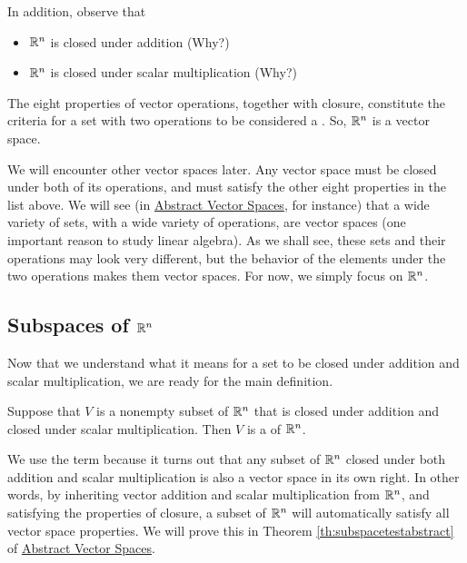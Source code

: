 \documentclass{ximera}
\begin{document}
  In addition, observe that  
  \begin{itemize}
      \item[]  $\mathbb{R}^n$ is closed under addition (Why?)
      \item[] $\mathbb{R}^n$ is closed under scalar multiplication (Why?)
\end{itemize}      
      The eight properties of vector operations, together with closure, constitute the criteria for a set with two operations to be considered a . So, $\mathbb{R}^n$ is a vector space.  
      
      We will encounter other vector spaces later. Any vector space must be closed under both of its operations, and must satisfy the other eight properties in the list above.  We will see (in \href{https://ximera.osu.edu/oerlinalg/LinearAlgebra/VSP-0050/main}{Abstract Vector Spaces}, for instance) that a wide variety of sets, with a wide variety of operations, are vector spaces (one important reason to study linear algebra).  As we shall see, these sets and their operations may look very different, but the behavior of the elements under the two operations makes them vector spaces.  For now, we simply focus on $\mathbb{R}^n$.


\subsection*{Subspaces of $\mathbb{R}^n$}

Now that we understand what it means for a set to be closed under addition and scalar multiplication, we are ready for the main definition.

\begin{definition}\label{def:subspace} Suppose that $V$ is a nonempty subset of $\mathbb{R}^n$ that is closed under addition and closed under scalar multiplication.  Then $V$ is a  of $\mathbb{R}^n$.
\end{definition}
We use the term  because it turns out that any subset of $\mathbb{R}^n$ closed under both addition and scalar multiplication is also a vector space in its own right.  In other words, by inheriting vector addition and scalar multiplication from $\mathbb{R}^n$, and satisfying the properties of closure, a subset of $\mathbb{R}^n$ will automatically satisfy all vector space properties.  We will prove this in Theorem \ref{th:subspacetestabstract} of \href{https://ximera.osu.edu/oerlinalg/LinearAlgebra/VSP-0050/main}{Abstract Vector Spaces}.
\end{document}
